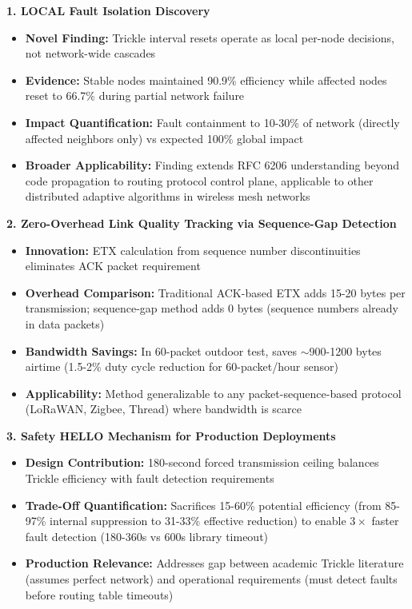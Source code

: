 \textbf{1. LOCAL Fault Isolation Discovery}
\begin{itemize}
\item \textbf{Novel Finding:} Trickle interval resets operate as local per-node decisions, not network-wide cascades
\item \textbf{Evidence:} Stable nodes maintained 90.9\% efficiency while affected nodes reset to 66.7\% during partial network failure
\item \textbf{Impact Quantification:} Fault containment to 10-30\% of network (directly affected neighbors only) vs expected 100\% global impact
\item \textbf{Broader Applicability:} Finding extends RFC 6206 understanding beyond code propagation to routing protocol control plane, applicable to other distributed adaptive algorithms in wireless mesh networks
\end{itemize}

\textbf{2. Zero-Overhead Link Quality Tracking via Sequence-Gap Detection}
\begin{itemize}
\item \textbf{Innovation:} ETX calculation from sequence number discontinuities eliminates ACK packet requirement
\item \textbf{Overhead Comparison:} Traditional ACK-based ETX adds 15-20 bytes per transmission; sequence-gap method adds 0 bytes (sequence numbers already in data packets)
\item \textbf{Bandwidth Savings:} In 60-packet outdoor test, saves $\sim$900-1200 bytes airtime (1.5-2\% duty cycle reduction for 60-packet/hour sensor)
\item \textbf{Applicability:} Method generalizable to any packet-sequence-based protocol (LoRaWAN, Zigbee, Thread) where bandwidth is scarce
\end{itemize}

\textbf{3. Safety HELLO Mechanism for Production Deployments}
\begin{itemize}
\item \textbf{Design Contribution:} 180-second forced transmission ceiling balances Trickle efficiency with fault detection requirements
\item \textbf{Trade-Off Quantification:} Sacrifices 15-60\% potential efficiency (from 85-97\% internal suppression to 31-33\% effective reduction) to enable $3\times$ faster fault detection (180-360s vs 600s library timeout)
\item \textbf{Production Relevance:} Addresses gap between academic Trickle literature (assumes perfect network) and operational requirements (must detect faults before routing table timeouts)
\end{itemize}


